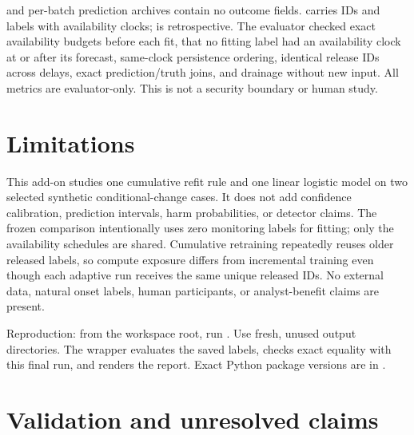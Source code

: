 \documentclass[11pt,a4paper]{article}
\begin{document}
\texttt{} and per-batch prediction archives contain no outcome fields. \texttt{} carries IDs and labels with availability clocks; \texttt{} is retrospective. The evaluator checked exact availability budgets before each fit, that no fitting label had an availability clock at or after its forecast, same-clock persistence ordering, identical release IDs across delays, exact prediction/truth joins, and drainage without new input. All metrics are evaluator-only. This is not a security boundary or human study.\par

\section{Limitations}

This add-on studies one cumulative refit rule and one linear logistic model on two selected synthetic conditional-change cases. It does not add confidence calibration, prediction intervals, harm probabilities, or detector claims. The frozen comparison intentionally uses zero monitoring labels for fitting; only the availability schedules are shared. Cumulative retraining repeatedly reuses older released labels, so compute exposure differs from incremental training even though each adaptive run receives the same unique released IDs. No external data, natural onset labels, human participants, or analyst-benefit claims are present.\par

Reproduction: from the workspace root, run \texttt{}. Use fresh, unused output directories. The wrapper evaluates the saved labels, checks exact equality with this final run, and renders the report. Exact Python package versions are in \texttt{}.\par


\section{Validation and unresolved claims}
\end{document}
